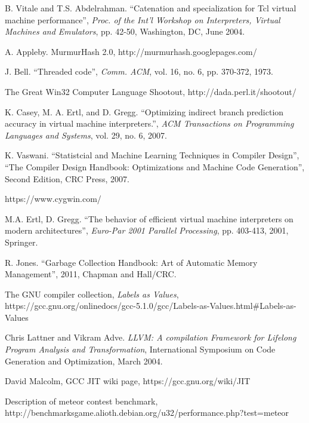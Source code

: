\documentclass[preprint]{sigplanconf}
\begin{document}
\begin{thebibliography}{}
\softraggedright

B. Vitale and T.S. Abdelrahman. ``Catenation and specialization for
Tcl virtual machine performance'', \emph{Proc. of the Int'l Workshop on
Interpreters, Virtual Machines and Emulators}, pp. 42-50, Washington,
DC, June 2004.

A. Appleby. MurmurHash 2.0,
http://murmurhash.googlepages.com/

  J. Bell. ``Threaded code'', \emph{Comm. ACM}, vol. 16, no. 6,
  pp. 370-372, 1973.

  The Great Win32 Computer Language Shootout,
  http://dada.perl.it/shootout/
  
  K. Casey, M. A. Ertl, and D. Gregg. ``Optimizing indirect
  branch prediction accuracy in virtual machine interpreters.'',
  \emph{ACM Transactions on Programming Languages and Systems},
  vol. 29, no. 6, 2007.

  K. Vaswani. ``Statistcial and Machine Learning Techniques in Compiler Design'',
  ``The Compiler Design Handbook: Optimizations and Machine Code Generation'',
   Second Edition, CRC Press, 2007.
  
https://www.cygwin.com/

M.A. Ertl, D. Gregg. ``The behavior of efficient virtual machine
interpreters on modern architectures'', \emph{Euro-Par 2001 Parallel
  Processing},  pp. 403-413, 2001, Springer.

R. Jones. ``Garbage Collection Handbook: Art of Automatic Memory Management'',
2011, Chapman and Hall/CRC.

 The GNU compiler collection, \emph{Labels as Values},
https://gcc.gnu.org/onlinedocs/gcc-5.1.0/gcc/Labels-as-Values.html\#Labels-as-Values
  
Chris Lattner and Vikram Adve.  \emph{LLVM: A compilation
  Framework for Lifelong Program Analysis and Transformation},
International Symposium on Code Generation and Optimization, March
2004.

 David Malcolm, GCC JIT wiki page,
https://gcc.gnu.org/wiki/JIT
  
  Description of meteor contest benchmark,
  http://benchmarksgame.alioth.debian.org/u32/performance.php?test=meteor
  

\end{thebibliography}
\end{document}
